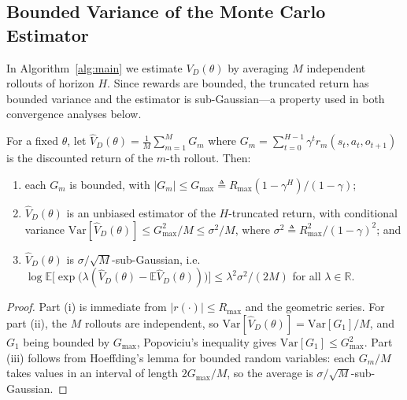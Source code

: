 \documentclass[12pt]{article}
\renewcommand{\[}{\left[}
\renewcommand{\]}{\right]}
\renewcommand{\(}{\left(}
\renewcommand{\)}{\right)}
\newcounter{l1}
\newcounter{l2}
\newcounter{l3}
\newcommand{\Rmax}{R_{\max}}
\begin{document}
\subsection{Bounded Variance of the Monte Carlo Estimator}
\label{sec:mc_variance}

In Algorithm~\ref{alg:main} we estimate $V_D(\theta)$ by averaging $M$ independent
rollouts of horizon $H$. Since rewards are bounded, the truncated return has bounded
variance and the estimator is sub-Gaussian---a property used in both convergence
analyses below.

\begin{lemma}\label{lem:mc_variance}
For a fixed $\theta$, let $\widehat{V}_D(\theta) = \frac{1}{M}\sum_{m=1}^M G_m$ where
$G_m = \sum_{t=0}^{H-1}\gamma^t r_m(s_t,a_t,o_{t+1})$ is the discounted return of the
$m$-th rollout. Then:
\begin{enumerate}
  \item[\normalfont(i)] each $G_m$ is bounded, with
    $|G_m| \le G_{\max} \triangleq \Rmax(1-\gamma^H)/(1-\gamma)$;
  \item[\normalfont(ii)] $\widehat{V}_D(\theta)$ is an unbiased estimator of the
    $H$-truncated return, with conditional variance
    $\mathrm{Var}[\widehat{V}_D(\theta)] \le G_{\max}^2/M \le \sigma^2/M$, where
    $\sigma^2 \triangleq \Rmax^2/(1-\gamma)^2$; and
  \item[\normalfont(iii)] $\widehat{V}_D(\theta)$ is $\sigma/\sqrt{M}$-sub-Gaussian, i.e.\
    $\log \mathbb{E}\bigl[\exp\bigl(\lambda(\widehat{V}_D(\theta) - \mathbb{E}\widehat{V}_D(\theta))\bigr)\bigr]
    \le \lambda^2\sigma^2/(2M)$ for all $\lambda \in \mathbb{R}$.
\end{enumerate}
\end{lemma}

\begin{proof}
Part (i) is immediate from $|r(\cdot)|\le\Rmax$ and the geometric series. For part (ii),
the $M$ rollouts are independent, so
$\mathrm{Var}[\widehat{V}_D(\theta)] = \mathrm{Var}[G_1]/M$, and $G_1$ being bounded by
$G_{\max}$, Popoviciu's inequality gives $\mathrm{Var}[G_1] \le G_{\max}^2$. Part (iii)
follows from Hoeffding's lemma for bounded random variables: each $G_m/M$ takes values in
an interval of length $2G_{\max}/M$, so the average is $\sigma/\sqrt{M}$-sub-Gaussian.

\end{proof}
\end{document}
